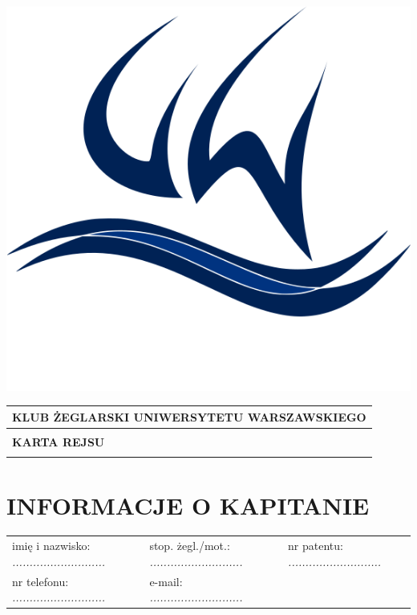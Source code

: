 \documentclass{article}
\author{Andrzej Gwiazda}
\begin{document}
\newpage
\begin{minipage}{0.11\textwidth}
\includegraphics[width=\textwidth]{logo.png}
\end{minipage}
\begin{minipage}{0.89\textwidth}
\begin{tabularx}{\textwidth} { 
  | >{\centering\arraybackslash}X | }
 \hline
 \textbf{KLUB ŻEGLARSKI UNIWERSYTETU WARSZAWSKIEGO} \\
 \hline
 \\
 \textbf{\huge KARTA REJSU} \\
 \\
\hline
\end{tabularx}
\end{minipage}

\section*{INFORMACJE O KAPITANIE}
\begin{tabularx}{\textwidth}{X X X}
imię i nazwisko: \textit{...........................} & stop. żegl./mot.: \textit{...........................} & nr patentu: \textit{...........................} \\
nr telefonu: \textit{...........................} & e-mail: \textit{...........................} \\
\end{tabularx}
\end{document}
